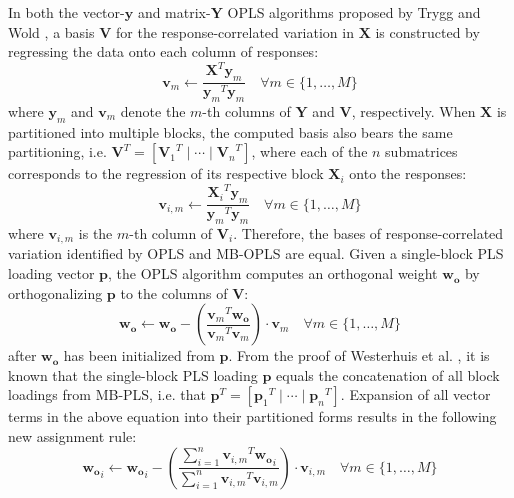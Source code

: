 \begin{doublespace}
In both the vector-$\mathbf{y}$ and matrix-$\mathbf{Y}$ OPLS algorithms
proposed by Trygg and Wold \cite{trygg:jchemo2002}, a basis $\mathbf{V}$
for the response-correlated variation in $\mathbf{X}$ is constructed by
regressing the data onto each column of responses:
\begin{equation}
\mathbf{v}_m \gets \frac{\mathbf{X}^T \mathbf{y}_m}
                        {{\mathbf{y}_m}^T \mathbf{y}_m}
 \quad \forall m \in \{1, \dots, M\}
\end{equation}
where $\mathbf{y}_m$ and $\mathbf{v}_m$ denote the $m$-th columns of
$\mathbf{Y}$ and $\mathbf{V}$, respectively. When $\mathbf{X}$ is partitioned
into multiple blocks, the computed basis also bears the same partitioning,
i.e. $\mathbf{V}^T=[{\mathbf{V}_1}^T\mid\cdots\mid{\mathbf{V}_n}^T]$, where
each of the $n$ submatrices corresponds to the regression of its respective
block $\mathbf{X}_i$ onto the responses:
\begin{equation}
\mathbf{v}_{i,m} \gets \frac{{\mathbf{X}_i}^T \mathbf{y}_m}
                            {{\mathbf{y}_m}^T \mathbf{y}_m}
 \quad \forall m \in \{1, \dots, M\}
\end{equation}
where $\mathbf{v}_{i,m}$ is the $m$-th column of $\mathbf{V}_i$. Therefore,
the bases of response-correlated variation identified by OPLS and MB-OPLS
are equal. Given a single-block PLS loading vector $\mathbf{p}$, the OPLS
algorithm computes an orthogonal weight $\mathbf{w_o}$ by orthogonalizing
$\mathbf{p}$ to the columns of $\mathbf{V}$:
\begin{equation}
\mathbf{w_o} \gets \mathbf{w_o} - \left(
 \frac{{\mathbf{v}_m}^T \mathbf{w_o}}
      {{\mathbf{v}_m}^T \mathbf{v}_m}
 \right) \cdot \mathbf{v}_m
 \quad \forall m \in \{1, \dots, M\}
\end{equation}
after $\mathbf{w_o}$ has been initialized from $\mathbf{p}$. From the proof
of Westerhuis et al. \cite{westerhuis:jchemo1998}, it is known that the
single-block PLS loading $\mathbf{p}$ equals the concatenation of all block
loadings from MB-PLS, i.e. that
$\mathbf{p}^T=[{\mathbf{p}_1}^T\mid\cdots\mid{\mathbf{p}_n}^T]$. Expansion
of all vector terms in the above equation into their partitioned forms
results in the following new assignment rule:
\begin{equation}
\mathbf{w_o}_i \gets \mathbf{w_o}_i - \left(
 \frac{\sum_{i=1}^n {\mathbf{v}_{i,m}}^T \mathbf{w_o}_i}
      {\sum_{i=1}^n {\mathbf{v}_{i,m}}^T \mathbf{v}_{i,m}}
 \right) \cdot \mathbf{v}_{i,m}
 \quad \forall m \in \{1, \dots, M\}
\end{equation}


\end{doublespace}
